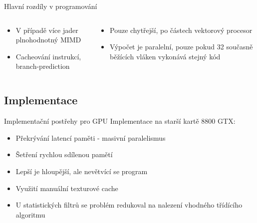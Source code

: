 \documentclass[compress,mathserif]{beamer}
\theoremstyle{definition}
\theoremstyle{plain}
\newcommand{\beI}{\begin{itemize}}
\newcommand{\enI}{\end{itemize}}
\begin{document}
\begin{frame}{Hlavní rozdíly v programování}
    \begin{minipage}{\textwidth}
        \begin{columns}
        \begin{column}{0.4\textwidth}
            \begin{center}
                \beI
                    \item V případě více jader plnohodnotný MIMD
                    \item Cacheování instrukcí, branch-prediction
                \enI
            \end{center}
        \end{column}
        \begin{column}{0.6\textwidth}
            \begin{center}
                \beI
                    \item Pouze chytřejší, po částech vektorový procesor
                    \item Výpočet je paralelní, pouze pokud 32 současně běžících vláken vykonává stejný kód
                \enI
            \end{center}
        \end{column}
        \end{columns}
    \end{minipage}
    
    \end{frame}
    
\subsection{Implementace}
    \begin{frame}{Implementační postřehy pro GPU}
      Implementace na starší kartě 8800 GTX:  
      \beI
        \item Překrývání latencí paměti - masivní paralelismus
        \item Šetření rychlou sdílenou pamětí
        \item Lepší je hloupější, ale nevětvící se program
        \item Využití manuální texturové cache
        \item U statistických filtrů se problém redukoval na 
            nalezení vhodného třídícího algoritmu
      \enI
    \end{frame}
\end{document}
